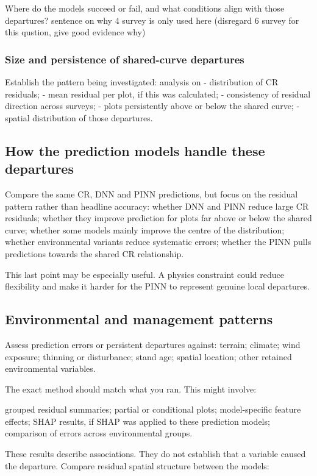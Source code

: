Where do the models succeed or fail, and what conditions align with those departures?
sentence on why 4 survey is only used here (disregard 6 survey for this qustion, give good evidence why) 

\subsubsection{Size and persistence of shared-curve departures}
Establish the pattern being investigated: analysis on 
- distribution of CR residuals;
- mean residual per plot, if this was calculated;
- consistency of residual direction across surveys;
- plots persistently above or below the shared curve;
- spatial distribution of those departures.

\subsection{How the prediction models handle these departures}
Compare the same CR, DNN and PINN predictions, but focus on the residual pattern rather than headline accuracy:
whether DNN and PINN reduce large CR residuals;
whether they improve prediction for plots far above or below the shared curve;
whether some models mainly improve the centre of the distribution;
whether environmental variants reduce systematic errors;
whether the PINN pulls predictions towards the shared CR relationship.

This last point may be especially useful. A physics constraint could reduce flexibility and make it harder for the PINN to represent genuine local departures.

\subsection{Environmental and management patterns}
Assess prediction errors or persistent departures against:
terrain;
climate;
wind exposure;
thinning or disturbance;
stand age;
spatial location;
other retained environmental variables.

The exact method should match what you ran. This might involve:

grouped residual summaries;
partial or conditional plots;
model-specific feature effects;
SHAP results, if SHAP was applied to these prediction models;
comparison of errors across environmental groups.

These results describe associations. They do not establish that a variable caused the departure.
Compare residual spatial structure between the models:

